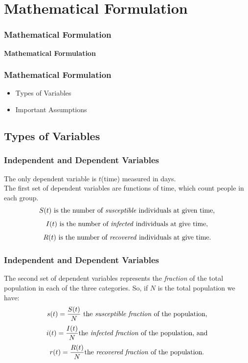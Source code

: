 \documentclass{beamer}
\begin{document}
\section{Mathematical Formulation}
\begin{frame}\frametitle{Mathematical Formulation}
\begin{center}
    \textbf{Mathematical Formulation}
\end{center}
\end{frame}


\begin{frame}\frametitle{Mathematical Formulation}
\begin{itemize}
\item Types of Variables
\item Important Assumptions
\end{itemize}
\end{frame}

\subsection{Types of Variables}
\begin{frame}\frametitle{Independent and Dependent Variables}
    The only dependent variable is $t$(time) measured in days.\\
    \vspace{0.15in}
    The first set of dependent variables are functions of time, which count people in each group.
    $$S(t)\text{ is the number of \textit{susceptible} individuals at given time,}$$
    $$I(t)\text{ is the number of \textit{infected} individuals at give time,}$$
    $$R(t)\text{ is the number of \textit{recovered} individuals at give time.}$$
\end{frame}

\begin{frame}\frametitle{Independent and Dependent Variables}
The second set of dependent variables represents the \textit{fraction} of the total population in
each of the three categories. So, if $N$ is the total population we have:
    $$s(t) = \frac{S(t)}{N}\text{ the \textit{susceptible fraction} of the population,}$$
    $$i(t) = \frac{I(t)}{N}\text{the \textit{infected fraction} of the population, and}$$
    $$r(t) = \frac{R(t)}{N}\text{the \textit{recovered fraction} of the population.}$$
\end{frame}
\end{document}
